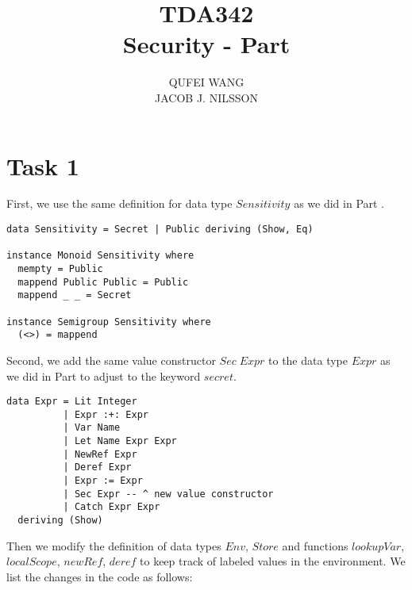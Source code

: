 \documentclass[10pt]{article}
\title{TDA342\\ Security - Part \RomanNumeralCaps 2}
\author{QUFEI WANG \\ JACOB J. NILSSON}
\newcommand{\RomanNumeralCaps}[1]
    {\MakeUppercase{\romannumeral #1}}
\begin{document}
\maketitle
\section*{Task 1}
First, we use the same definition for data type $Sensitivity$ as we did in Part \RomanNumeralCaps 1.
\begin{lstlisting}
data Sensitivity = Secret | Public deriving (Show, Eq)

instance Monoid Sensitivity where
  mempty = Public
  mappend Public Public = Public
  mappend _ _ = Secret

instance Semigroup Sensitivity where
  (<>) = mappend
\end{lstlisting}
Second, we add the same value constructor $Sec\; Expr$ to the data type $Expr$ as we did in  Part \RomanNumeralCaps 1 to adjust to the keyword $secret$.
\begin{lstlisting}
data Expr = Lit Integer
          | Expr :+: Expr
          | Var Name
          | Let Name Expr Expr
          | NewRef Expr
          | Deref Expr
          | Expr := Expr 
          | Sec Expr -- ^ new value constructor
          | Catch Expr Expr
  deriving (Show)
\end{lstlisting}
Then we modify the definition of data types $Env$, $Store$ and functions $lookupVar$, $localScope$, $newRef$, $deref$ to keep track of labeled values in the environment. We list the changes in the code as follows:
\end{document}
